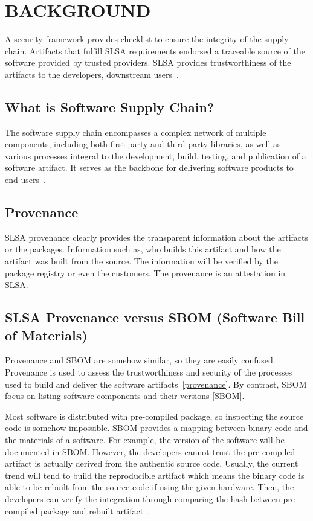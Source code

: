 \section{BACKGROUND}
A security framework provides checklist to ensure the integrity of the supply chain.
Artifacts that fulfill SLSA requirements endorsed a traceable source of the software provided
by trusted providers. SLSA provides trustworthiness of the artifacts to the developers, downstream users~\cite{slsa2023}. 

\subsection{What is Software Supply Chain?}
The software supply chain encompasses a complex network of multiple components, including both first-party and third-party libraries, 
as well as various processes integral to the development, build, testing, and publication of a software artifact. 
It serves as the backbone for delivering software products to end-users~\cite{DoDDefCI/CD2023}.

\subsection{Provenance}
SLSA provenance clearly provides the transparent information about the artifacts or the packages.
Information such as, who builds this artifact and how the artifact was built from the source.
The information will be verified by the package registry or even the customers. The provenance
is an attestation in SLSA.

\subsection{SLSA Provenance versus SBOM (Software Bill of Materials)}
Provenance and SBOM are somehow similar, so they are easily confused. Provenance is used to 
assess the trustworthiness and security of the processes used to build and deliver the software artifacts~\ref{provenance}.
By contrast, SBOM focus on listing software components and their versions \ref{SBOM}.

Most software is distributed with pre-compiled package, so inspecting the source code is somehow impossible.
SBOM provides a mapping between binary code and the materials of a software. For example, the version of the 
software will be documented in SBOM. However, the developers cannot trust the pre-compiled artifact is actually 
derived from the authentic source code. Usually, the current trend will tend to build the reproducible artifact which
means the binary code is able to be rebuilt from the source code if using the given hardware. 
Then, the developers can verify the integration through comparing the hash between pre-compiled package and rebuilt artifact~\cite{ferraiuolo2022policy}.


